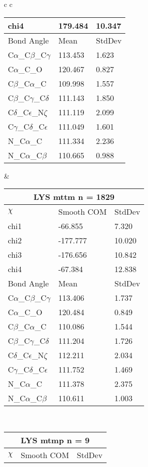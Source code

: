 \begin{longtable}{ c c }
\begin{tabular}{ l l l }
  chi4 & 179.484 & 10.347 \\ \midrule
  Bond Angle   & Mean     & StdDev \\ \midrule
  C$\alpha$\_C$\beta$\_C$\gamma$ & 113.453 & 1.623\\
  C$\alpha$\_C\_O & 120.467 & 0.827\\
  C$\beta$\_C$\alpha$\_C & 109.998 & 1.557\\
  C$\beta$\_C$\gamma$\_C$\delta$ & 111.143 & 1.850\\
  C$\delta$\_C$\epsilon$\_N$\zeta$ & 111.119 & 2.099\\
  C$\gamma$\_C$\delta$\_C$\epsilon$ & 111.049 & 1.601\\
  N\_C$\alpha$\_C & 111.334 & 2.236\\
  N\_C$\alpha$\_C$\beta$ & 110.665 & 0.988\\
  \bottomrule
  \end{tabular}
  &
  \begin{tabular}{ l l l }
  \toprule
  \multicolumn{3}{c}{LYS \textbf{mttm} n = 1829} \\ \toprule
  $\chi$       & Smooth COM & StdDev \\ \midrule
  chi1 & -66.855 & 7.320 \\ 
  chi2 & -177.777 & 10.020 \\ 
  chi3 & -176.656 & 10.842 \\ 
  chi4 & -67.384 & 12.838 \\ \midrule
  Bond Angle   & Mean     & StdDev \\ \midrule
  C$\alpha$\_C$\beta$\_C$\gamma$ & 113.406 & 1.737\\
  C$\alpha$\_C\_O & 120.484 & 0.849\\
  C$\beta$\_C$\alpha$\_C & 110.086 & 1.544\\
  C$\beta$\_C$\gamma$\_C$\delta$ & 111.204 & 1.726\\
  C$\delta$\_C$\epsilon$\_N$\zeta$ & 112.211 & 2.034\\
  C$\gamma$\_C$\delta$\_C$\epsilon$ & 111.752 & 1.469\\
  N\_C$\alpha$\_C & 111.378 & 2.375\\
  N\_C$\alpha$\_C$\beta$ & 110.611 & 1.003\\
  \bottomrule
  \end{tabular}
  \\
  \begin{tabular}{ l l l }
  \toprule
  \multicolumn{3}{c}{LYS \textbf{mtmp} n = 9} \\ \toprule
  $\chi$       & Smooth COM & StdDev \\ \midrule

\end{tabular}
\end{longtable}
